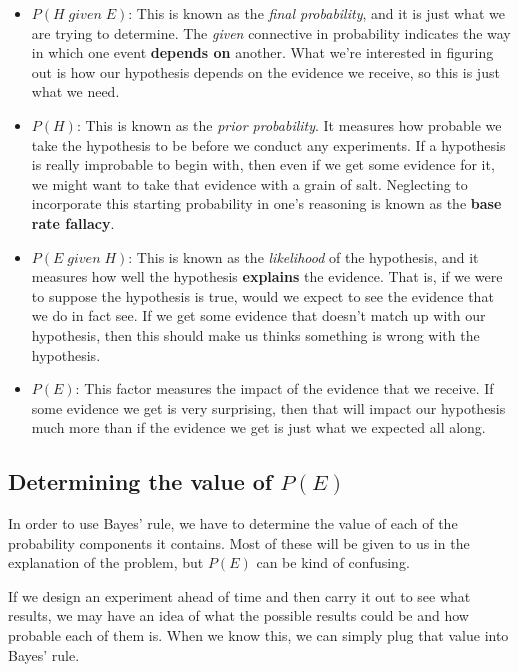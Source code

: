 \documentclass[letterpaper,10pt]{article}
\begin{document}
\begin{itemize}
 \item $P(H\; given\; E)$: This is known as the \textit{final probability}, and it is just what we are trying to determine. The \textit{given} connective in probability indicates the way in which one event \textbf{depends on} another.  What we're interested in figuring out is how our hypothesis depends on the evidence we receive, so this is just what we need.
 
 \item $P(H)$: This is known as the \textit{prior probability}.  It measures how probable we take the hypothesis to be before we conduct any experiments.  If a hypothesis is really improbable to begin with, then even if we get some evidence for it, we might want to take that evidence with a grain of salt.  Neglecting to incorporate this starting probability in one's reasoning is known as the \textbf{base rate fallacy}.
 
 \item $P(E\; given\; H)$: This is known as the \textit{likelihood} of the hypothesis, and it measures how well the hypothesis \textbf{explains} the evidence.  That is, if we were to suppose the hypothesis is true, would we expect to see the evidence that we do in fact see. If we get some evidence that doesn't match up with our hypothesis, then this should make us thinks something is wrong with the hypothesis.  
 
 \item $P(E)$: This factor measures the impact of the evidence that we receive. If some evidence we get is very surprising, then that will impact our hypothesis much more than if the evidence we get is just what we expected all along.
\end{itemize}

\subsection{Determining the value of $P(E)$}

In order to use Bayes' rule, we have to determine the value of each of the probability components it contains. Most of these will be given to us in the explanation of the problem, but $P(E)$ can be kind of confusing.  

If we design an experiment ahead of time and then carry it out to see what results, we may have an idea of what the possible results could be and how probable each of them is.  When we know this, we can simply plug that value into Bayes' rule.
\end{document}
